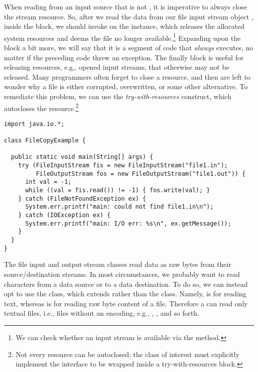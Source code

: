 When reading from an input source that is not , it is imperative to always close the stream resource. So, after we read the data from our file input stream object , inside the  block, we should invoke  on the instance, which releases the allocated system resources and deems the file no longer available.\footnote{We can check whether an input stream is available via the  method.} Expanding upon the  block a bit more, we will say that it is a segment of code that \emph{always} executes, no matter if the preceding code threw an exception. The finally block is useful for releasing resources, e.g,. opened input streams, that otherwise may not be released. Many programmers often forget to close a resource, and then are left to wonder why a file is either corrupted, overwritten, or some other alternative. To remediate this problem, we can use the \emph{try-with-resources} construct, which autocloses the resource.\footnote{Not every resource can be autoclosed; the class of interest must explicitly implement the  interface to be wrapped inside a try-with-resources block.}


\begin{lstlisting}[language=MyJava]
import java.io.*;

class FileCopyExample {

  public static void main(String[] args) {
    try (FileInputStream fis = new FileInputStream("file1.in");
         FileOutputStream fos = new FileOutputStream("file1.out")) {
      int val = -1;
      while ((val = fis.read()) != -1) { fos.write(val); }
    } catch (FileNotFoundException ex) {
      System.err.printf("main: could not find file1.in\n");
    } catch (IOException ex) {
      System.err.printf("main: I/O err: %s\n", ex.getMessage());
    }
  }
}
\end{lstlisting}

The file input and output stream classes read data as raw bytes from their source/destination streams. In most circumstances, we probably want to read characters from a data source or to a data destination. To do so, we can instead opt to use the  class, which extends  rather than the  class. Namely,  is for reading text, whereas  is for reading raw byte content of a file. Therefore a  can read only textual files, i.e., files without an encoding, e.g., , , and so forth.

